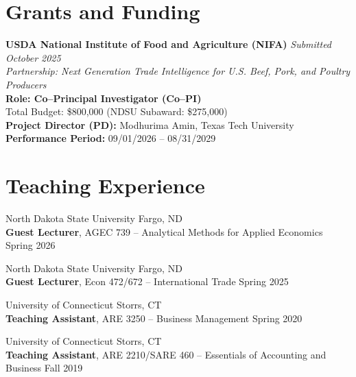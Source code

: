 \documentclass[10.8 pt,letterpaper]{article}
\renewenvironment{itemize}{
	\begin{list}{}{
			\setlength{\leftmargin}{1.5em}
		}
	}{
	\end{list}
}
\begin{document}
	
	\section*{\textbf{Grants and Funding}}
	
	\begin{itemize}
		\item[-] \textbf{USDA National Institute of Food and Agriculture (NIFA)} \hfill \textit{Submitted October 2025} \\
		\textit{Partnership: Next Generation Trade Intelligence for U.S. Beef, Pork, and Poultry Producers} \\
		\textbf{Role: Co–Principal Investigator (Co–PI)} \\
		Total Budget: \$800,000 \hfill (NDSU Subaward: \$275,000) \\
		\textbf{Project Director (PD):} Modhurima Amin, Texas Tech University \\
		\textbf{Performance Period:} 09/01/2026 – 08/31/2029 \\
	\end{itemize}
	
	
	\section*{\textbf{Teaching Experience}}
	\begin{itemize}
		\item[-] North Dakota State University \hfill Fargo, ND \\
		\textbf{Guest Lecturer}, AGEC 739 – Analytical Methods for Applied Economics \hfill Spring 2026

		\item[-] North Dakota State University \hfill Fargo, ND \\
		\textbf{Guest Lecturer}, Econ 472/672 – International Trade \hfill Spring 2025
		
		\item[-] University of Connecticut \hfill Storrs, CT \\
		\textbf{Teaching Assistant}, ARE 3250 – Business Management \hfill Spring 2020
		
		\item[-] University of Connecticut \hfill Storrs, CT \\
		\textbf{Teaching Assistant}, ARE 2210/SARE 460 – Essentials of Accounting and Business \hfill Fall 2019
	\end{itemize}
\end{document}
